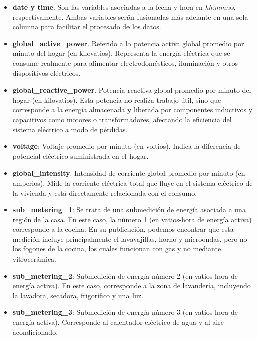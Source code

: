 \begin{itemize}
	\item \textbf{date y time}. Son las variables asociadas a la fecha y hora en \textit{hh:mm:ss}, respectivamente. Ambas variables serán fusionadas más adelante en una sola columna para facilitar el procesado de los datos.
	
	\item \textbf{global\_active\_power}. Referido a la potencia activa global promedio por minuto del hogar (en kilovatios). Representa la energía eléctrica que se consume realmente para alimentar electrodomésticos, iluminación y otros dispositivos eléctricos.
	
	\item \textbf{global\_reactive\_power}. Potencia reactiva global promedio por minuto del hogar (en kilovatios). Esta potencia no realiza trabajo útil, sino que corresponde a la energía almacenada y liberada por componentes inductivos y capacitivos como motores o transformadores, afectando la eficiencia del sistema eléctrico a modo de pérdidas.
	
	\item \textbf{voltage}: Voltaje promedio por minuto (en voltios). Indica la diferencia de potencial eléctrico suministrada en el hogar.
	
	\item \textbf{global\_intensity}. Intensidad de corriente global promedio por minuto (en amperios). Mide la corriente eléctrica total que fluye en el sistema eléctrico de la vivienda y está directamente relacionada con el consumo.
	
	\item \textbf{sub\_metering\_1}: Se trata de una submedición de energía asociada a una región de la casa. En este caso, la número 1 (en vatios-hora de energía activa) corresponde a la cocina. En su publicación, podemos encontrar que esta medición incluye principalmente el lavavajillas, horno y microondas, pero no los fogones de la cocina, los cuales funcionan con gas y no mediante vitrocerámica.
	
	\item \textbf{sub\_metering\_2}: Submedición de energía número 2 (en vatios-hora de energía activa). En este caso, corresponde a la zona de lavandería, incluyendo la lavadora, secadora, frigorífico y una luz.
	
	\item \textbf{sub\_metering\_3}: Submedición de energía número 3 (en vatios-hora de energía activa). Corresponde al calentador eléctrico de agua y al aire acondicionado.
\end{itemize}

